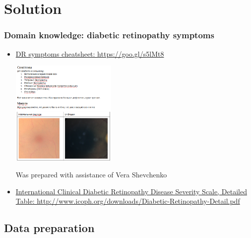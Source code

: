 \section{Solution}

\begin{frame}\frametitle{Domain knowledge: diabetic retinopathy symptoms}

\vspace{-0.9cm}
\begin{itemize}
\item {\hyperlink{https://goo.gl/s5lMt8}{DR symptoms cheatsheet: https://goo.gl/s5lMt8}
\begin{center}
\par \includegraphics[interpolate=true,valign=c,width=0.4\textwidth]{pics/symptoms_pic.png}
\end{center}
Was prepared with assistance of Vera Shevchenko
}
\item \href{http://www.icoph.org/downloads/Diabetic-Retinopathy-Detail.pdf}{International Clinical Diabetic Retinopathy Disease Severity Scale, Detailed Table: \small http://www.icoph.org/downloads/Diabetic-Retinopathy-Detail.pdf}
\end{itemize}

\end{frame}

\subsection{Data preparation}


